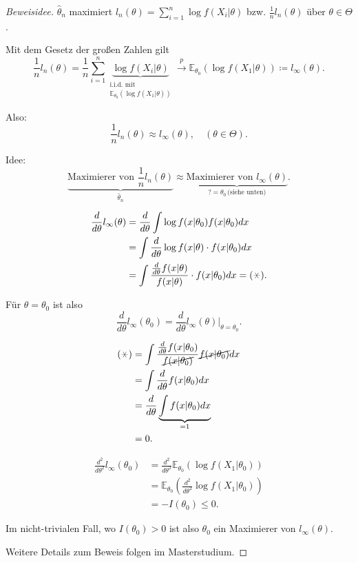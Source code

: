 \documentclass{tstextbook}
\newcommand{\E}{\mathbb E}
\begin{document}
	\begin{proof}[Beweisidee]
		$ \hat{\theta}_n $ maximiert $ l_n(\theta)=\sum_{i=1}^{n} \log f(X_i|\theta) $ bzw. $ \frac{1}{n}l_n(\theta) $ über $ \theta\in\Theta $. 
		
		Mit dem Gesetz der großen Zahlen gilt
		\[
		\frac{1}{n}l_n(\theta) = \frac{1}{n}\sum_{i=1}^{n} \underbrace{\log f(X_i|\theta)}_{\substack{\text{i.i.d. mit } \\ \E_{\theta_0}(\log f(X_1|\theta))}} \xrightarrow{p} \E_{\theta_0}(\log f(X_1|\theta)) \coloneqq l_\infty(\theta).
		\]
		
		Also:
		\[
		\frac{1}{n}l_n(\theta) \approx l_\infty(\theta), \quad (\theta\in\Theta).
		\]
		
		Idee: 
		\[
		\underbrace{\text{Maximierer von }\frac{1}{n}l_n(\theta)}_{\hat{\theta}_n} \approx \underbrace{\text{Maximierer von }l_\infty(\theta)}_{?=\theta_0 \, \text{(siehe unten)}}.
		\]
		
		\[
		\begin{aligned}
			\frac{d}{d\theta}l_\infty(\theta) & = \frac{d}{d\theta}\int\log f(x|\theta_0) f(x|\theta_0) dx \\
			& = \int \frac{d}{d\theta}\log f(x|\theta)\cdot f(x|\theta_0) dx \\
			& = \int \frac{\frac{d}{d\theta}f(x|\theta)}{f(x|\theta)}\cdot f(x|\theta_0) dx = (\hexstar).
		\end{aligned}
		\]
		
		Für $ \theta = \theta_0 $ ist also 
		\[
		\frac{d}{d\theta}l_\infty(\theta_0) = \frac{d}{d\theta}l_\infty(\theta)\Big|_{\theta=\theta_0} .
		\]
		
		\[
		\begin{aligned}
			(\hexstar) & = \int \frac{\frac{d}{d\theta}f(x|\theta_0)}{\cancel{f(x|\theta_0)}} \cancel{f(x|\theta_0)} dx \\
			& = \int \frac{d}{d\theta} f(x|\theta_0) dx \\
			& = \frac{d}{d\theta} \underbrace{\int f(x|\theta_0) dx}_{=1} \\
			& = 0.
		\end{aligned}
		\]
		
		\[
		\begin{aligned}
			\frac{d^2}{d\theta^2} l_\infty(\theta_0) & = \frac{d^2}{d\theta^2} \E_{\theta_0} \left(\log f(X_1|\theta_0)\right) \\
			& = \E_{\theta_0}\left(\frac{d^2}{d\theta^2}\log f(X_1|\theta_0)\right) \\
			& = - I(\theta_0) \le 0.
		\end{aligned}
		\]
		
		Im nicht-trivialen Fall, wo $ I(\theta_0)>0 $ ist also $ \theta_0 $ ein Maximierer von $ l_\infty(\theta) $. 
		
		Weitere Details zum Beweis folgen im Masterstudium.
	\end{proof}
	
\end{document}
